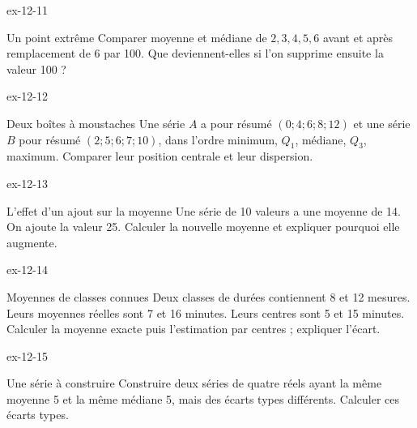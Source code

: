 \clearpage{}
\begin{blocLivre}{ex-12-11}
\begin{exercice}[3]{Un point extrême}
Comparer moyenne et médiane de $2,3,4,5,6$ avant et après remplacement de 6 par 100. Que deviennent-elles si l’on supprime ensuite la valeur 100 ?
\end{exercice}
\end{blocLivre}
\begin{blocLivre}{ex-12-12}
\begin{exercice}[3]{Deux boîtes à moustaches}
Une série $A$ a pour résumé $(0;4;6;8;12)$ et une série $B$ pour résumé $(2;5;6;7;10)$, dans l’ordre minimum, $Q_1$, médiane, $Q_3$, maximum. Comparer leur position centrale et leur dispersion.
\label{fig-ex-12-12}
\end{exercice}
\end{blocLivre}
\begin{blocLivre}{ex-12-13}
\begin{exercice}[3]{L’effet d’un ajout sur la moyenne}
Une série de 10 valeurs a une moyenne de 14. On ajoute la valeur 25. Calculer la nouvelle moyenne et expliquer pourquoi elle augmente.
\end{exercice}
\end{blocLivre}
\begin{blocLivre}{ex-12-14}
\begin{exercice}[3]{Moyennes de classes connues}
Deux classes de durées contiennent 8 et 12 mesures. Leurs moyennes réelles sont 7 et 16 minutes. Leurs centres sont 5 et 15 minutes. Calculer la moyenne exacte puis l’estimation par centres ; expliquer l’écart.
\end{exercice}
\end{blocLivre}
\begin{blocLivre}{ex-12-15}
\begin{exercice}[3]{Une série à construire}
Construire deux séries de quatre réels ayant la même moyenne 5 et la même médiane 5, mais des écarts types différents. Calculer ces écarts types.
\end{exercice}
\end{blocLivre}

\clearpage
